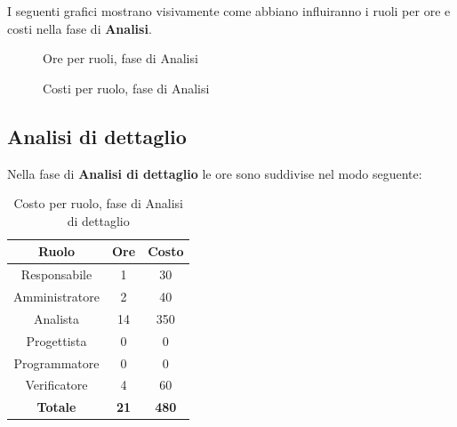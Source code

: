 I seguenti grafici mostrano visivamente come abbiano influiranno i ruoli per ore e costi nella fase di \textbf{Analisi}.
\begin{figure}[H]
\centering
{}
\caption{Ore per ruoli, fase di Analisi}
\end{figure}
\begin{figure}[H]
	\centering
	\caption{Costi per ruolo, fase di Analisi}
\end{figure}

\subsection{Analisi di dettaglio}
Nella fase di \textbf{Analisi di dettaglio} le ore sono suddivise nel modo seguente:
\begin{table}[H]
	\centering
	\begin{tabular}{|c|c|c|}
		\hline
		\textbf{Ruolo} &
		\textbf{Ore} &
		\textbf{Costo} \\
		\hline
		Responsabile & 1 & 30\\
		\hline
		Amministratore & 2 & 40\\
		\hline
		Analista & 14 & 350\\
		\hline
		Progettista & 0 & 0 \\
		\hline
		Programmatore & 0 & 0 \\
		\hline
		Verificatore & 4 & 60\\
		\hline
		\textbf{Totale} & \textbf{21} & \textbf{480} \\
		\hline
	\end{tabular}
	\caption{Costo per ruolo, fase di Analisi di dettaglio}
\end{table}

